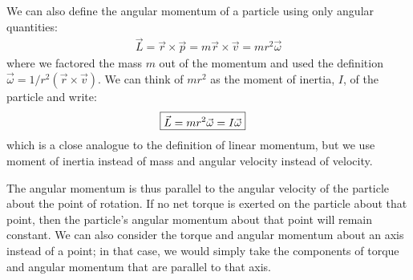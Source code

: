 We can also define the angular momentum of a particle using only angular quantities:
\begin{align*}
\vec L = \vec r \times \vec p =  m \vec r \times \vec v = mr^2 \vec\omega
\end{align*}
where we factored the mass $m$ out of the momentum and used the definition $\vec \omega = 1/r^2(\vec r \times \vec v)$. We can think of $mr^2$ as the moment of inertia, $I$, of the particle and write:
\begin{align}
\label{eq:angularmomentumrolling:liw}
\Aboxed{\vec L  = mr^2 \vec\omega = I \vec\omega}
\end{align}
which is a close analogue to the definition of linear momentum, but we use moment of inertia instead of mass and angular velocity instead of velocity. 

The angular momentum is thus parallel to the angular velocity of the particle about the point of rotation. If no net torque is exerted on the particle about that point, then the particle's angular momentum about that point will remain constant. We can also consider the torque and angular momentum about an axis instead of a point; in that case, we would simply take the components of torque and angular momentum that are parallel to that axis. 

